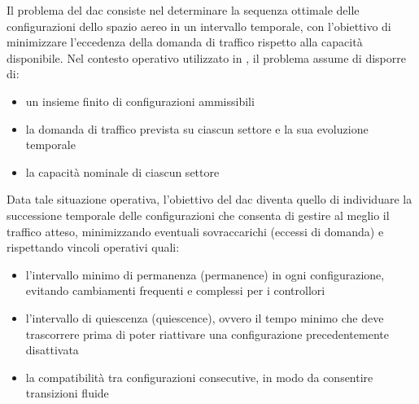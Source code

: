 Il problema del \gls{dac} consiste nel determinare la sequenza ottimale delle configurazioni dello spazio aereo in un intervallo temporale, con l'obiettivo di minimizzare l’eccedenza della domanda di traffico rispetto alla capacità disponibile. Nel contesto operativo utilizzato in \citep{galeazzo2024integer}, il problema assume di disporre di:
\begin{itemize}
    \item un insieme finito di configurazioni ammissibili
    \item la domanda di traffico prevista su ciascun settore e la sua evoluzione temporale
    \item la capacità nominale di ciascun settore
\end{itemize}
Data tale situazione operativa, l'obiettivo del \gls{dac} diventa quello di individuare la successione temporale delle configurazioni che consenta di gestire al meglio il traffico atteso, minimizzando eventuali sovraccarichi (eccessi di domanda) e rispettando vincoli operativi quali:
\begin{itemize}
    \item l’intervallo minimo di permanenza (permanence) in ogni configurazione, evitando cambiamenti frequenti e complessi per i controllori
    \item l’intervallo di quiescenza (quiescence), ovvero il tempo minimo che deve trascorrere prima di poter riattivare una configurazione precedentemente disattivata
    \item la compatibilità tra configurazioni consecutive, in modo da consentire transizioni fluide
\end{itemize}


